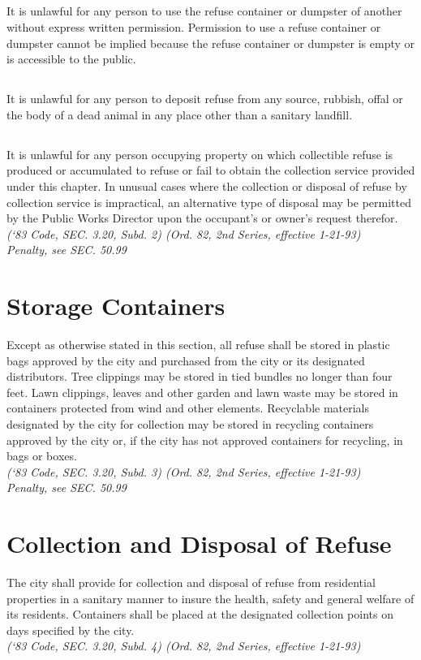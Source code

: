 \subsection{}
It is unlawful for any person to use the refuse container or dumpster of another without express written permission.  Permission to use a refuse container or dumpster cannot be implied because the refuse container or dumpster is empty or is accessible to the public.
\subsection{}
It is unlawful for any person to deposit refuse from any source, rubbish, offal or the body of a dead animal in any place other than a sanitary landfill.
\subsection{}
It is unlawful for any person occupying property on which collectible refuse is produced or accumulated to refuse or fail to obtain the collection service provided under this chapter.  In unusual cases where the collection or disposal of refuse by collection service is impractical, an alternative type of disposal may be permitted by the Public Works Director upon the occupant’s or owner’s request therefor.\\
\emph{(‘83 Code, SEC. 3.20, Subd. 2) (Ord. 82, 2nd Series, effective 1-21-93)}\\
\emph{Penalty, see SEC. 50.99}
\section{Storage Containers}
Except as otherwise stated in this section, all refuse shall be stored in plastic bags approved by the city and purchased from the city or its designated distributors.  Tree clippings may be stored in tied bundles no longer than four feet.  Lawn clippings, leaves and other garden and lawn waste may be stored in containers protected from wind and other elements.  Recyclable materials designated by the city for collection may be stored in recycling containers approved by the city or, if the city has not approved containers for recycling, in bags or boxes.\\
\emph{(‘83 Code, SEC. 3.20, Subd. 3) (Ord. 82, 2nd Series, effective 1-21-93)}\\
\emph{Penalty, see SEC. 50.99}
\section{Collection and Disposal of Refuse}
The city shall provide for collection and disposal of refuse from residential properties in a sanitary manner to insure the health, safety and general welfare of its residents.  Containers shall be placed at the designated collection points on days specified by the city.\\
\emph{(‘83 Code, SEC. 3.20, Subd. 4) (Ord. 82, 2nd Series, effective 1-21-93)}
